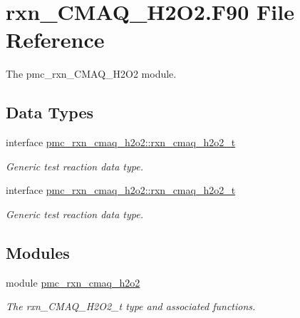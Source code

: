 \hypertarget{rxn___c_m_a_q___h2_o2_8_f90}{}\section{rxn\+\_\+\+C\+M\+A\+Q\+\_\+\+H2\+O2.\+F90 File Reference}
\label{rxn___c_m_a_q___h2_o2_8_f90}


The pmc\+\_\+rxn\+\_\+\+C\+M\+A\+Q\+\_\+\+H2\+O2 module.  


\subsection*{Data Types}
\begin{DoxyCompactItemize}
\item 
interface \mbox{\hyperlink{structpmc__rxn__cmaq__h2o2_1_1rxn__cmaq__h2o2__t}{pmc\+\_\+rxn\+\_\+cmaq\+\_\+h2o2\+::rxn\+\_\+cmaq\+\_\+h2o2\+\_\+t}}
\begin{DoxyCompactList}\small\item\em Generic test reaction data type. \end{DoxyCompactList}\item 
interface \mbox{\hyperlink{structpmc__rxn__cmaq__h2o2_1_1rxn__cmaq__h2o2__t}{pmc\+\_\+rxn\+\_\+cmaq\+\_\+h2o2\+::rxn\+\_\+cmaq\+\_\+h2o2\+\_\+t}}
\begin{DoxyCompactList}\small\item\em Generic test reaction data type. \end{DoxyCompactList}\end{DoxyCompactItemize}
\subsection*{Modules}
\begin{DoxyCompactItemize}
\item 
module \mbox{\hyperlink{namespacepmc__rxn__cmaq__h2o2}{pmc\+\_\+rxn\+\_\+cmaq\+\_\+h2o2}}
\begin{DoxyCompactList}\small\item\em The rxn\+\_\+\+C\+M\+A\+Q\+\_\+\+H2\+O2\+\_\+t type and associated functions. \end{DoxyCompactList}\end{DoxyCompactItemize}
